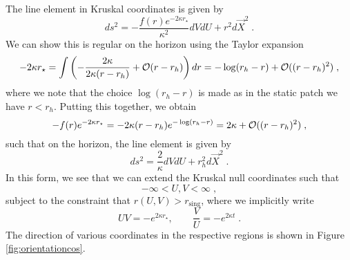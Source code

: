 The line element in Kruskal coordinates is given by
\begin{equation*}
     ds^2 = - \frac{f(r) e^{-2\kappa r_\star}}{\kappa^2} dV dU + r^2 d\vec{X}^2 \;.
\end{equation*}
We can show this is regular on the horizon using the Taylor expansion 
\begin{equation*}
    -2 \kappa r_\star = \int \left( - \frac{2 \kappa  }{2\kappa(r - r_h)} +  {\cal O}(r - r_h) \right) dr  = -\log(r_h - r)  +  {\cal O}((r - r_h)^2)\;,
\end{equation*}
where we note that the choice $\log(r_h - r)$ is made as in the static patch we have $r < r_h$. Putting this together, we obtain
\begin{equation*}
    -f(r) e^{-2\kappa r_\star} = - 2\kappa (r - r_h) e^{-\log(r_h - r)} = 2\kappa + {\cal O}((r - r_h)^2) \;,
\end{equation*}
such that on the horizon, the line element is given by
\begin{equation*}
     ds^2 = \frac{2}{\kappa} dV dU + r_h^2 d\vec{X}^2 \;.
\end{equation*}
In this form, we see that we can extend the Kruskal null coordinates such that
\begin{equation*}
    -\infty < U, V < \infty \;,
\end{equation*}
subject to the constraint that $r(U,V) > r_{\mathrm{sing}}$, where we implicitly write
\begin{equation*}
        U V = - e^{2 \kappa r_\star}, \qquad \frac{V}{U} = -e^{2 \kappa t} \;.
\end{equation*}
The direction of various coordinates in the respective regions is shown in Figure \ref{fig:orientationcos}.

